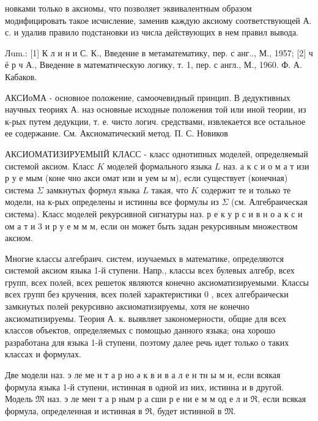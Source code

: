 \documentclass[10pt]{article}
\begin{document}
новками только в аксиомы, что позволяет эквивалентным образом модифицировать такое исчисление, заменив каждую аксиому соответствующей А. с. и удалив правило подстановки из числа действующих в нем правил вывода.



Лum.: [1] К л и н и С. К., Введение в метаматематику, пер. с анг.., М., 1957; [2] ч ё р ч А., Введение в математическую логику, т. 1, пер. с англ., М., 1960. Ф. А. Кабаков.



АКСИоМА - основное положение, самоочевидный принцип. В дедуктивных научных теориях А. наз основные исходные положения той или иной теории, из к-рых путем дедукции, т. е. чисто логич. средствами, извлекается все остальное ее содержание. См. Аксиоматический метод. П. С. Новиков



АКСИОМАТИЗИРУЕМЫІЙ КЛАСС - класс однотипных моделей, определяемый системой аксиом. Класс $K$ моделей формального языка $L$ наз. а к с и о м а т изи р у е мым (коне чно акси омат изи и уем ы м), если существует (конечная) система $\Sigma$ замкнутых формул языка $L$ такая, что $K$ содержит те и только те модели, на к-рых определены и истинны все формулы из $\Sigma$ (см. Алгебраическая система). Класс моделей рекурсивной сигнатуры наз. р е к у р с и в н о а к с и ом а т и 3 и р у е м м м, если он может быть задан рекурсивным множеством аксиом.



Многие классы алгебраич. систем, изучаемых в математике, определяются системой аксиом языка 1-й ступени. Напр., классы всех булевых алгебр, всех групп, всех полей, всех решеток являются конечно аксиоматизируемыми. Классы всех групп без кручения, всех полей характеристики 0 , всех алгебраически замкнутых полей рекурсивно аксиоматизируемы, хотя не конечно аксиоматизируемы. Теория А. к. выявляет закономерности, общие для всех классов объектов, определяемых с помощью данного языка; она хорошо разработана для языка 1-й ступени, поэтому далее речь идет только о таких классах и формулах.



Две модели наз. э ле ме н т а р но ә к в и в а л е н тн ы м и, если всякая формула языка 1-й ступени, истинная в одной из них, истинна и в другой. Модель $\mathfrak{M}$ наз. э ле мен т а р ным р а сши р е ни е м м од е л и $\mathfrak{R}$, если всякая формула, определенная и истинная в $\mathfrak{R}$, будет истинной в $\mathfrak{M}$.
\end{document}
